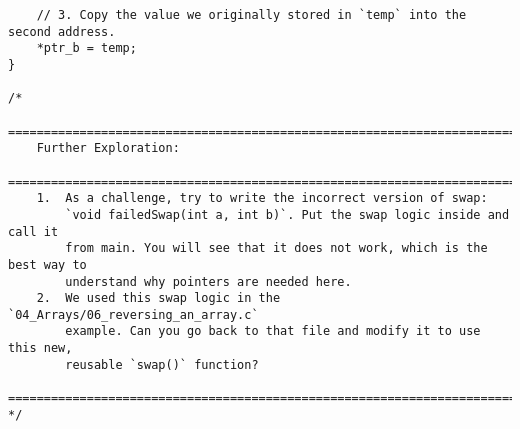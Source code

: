 \documentclass[11pt]{book}
\begin{document}
\begin{verbatim}
    // 3. Copy the value we originally stored in `temp` into the second address.
    *ptr_b = temp;
}

/*
    ================================================================================
    Further Exploration:
    ================================================================================
    1.  As a challenge, try to write the incorrect version of swap:
        `void failedSwap(int a, int b)`. Put the swap logic inside and call it
        from main. You will see that it does not work, which is the best way to
        understand why pointers are needed here.
    2.  We used this swap logic in the `04_Arrays/06_reversing_an_array.c`
        example. Can you go back to that file and modify it to use this new,
        reusable `swap()` function?
    ================================================================================
*/

\end{verbatim}
\clearpage
\end{document}
